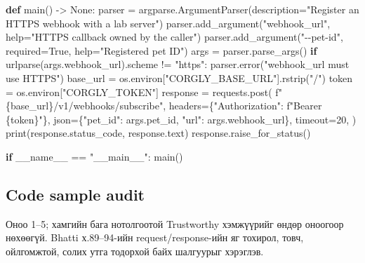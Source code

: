 \documentclass[
  mongolian,
]{article}
\newenvironment{Shaded}{}{}
\newcommand{\BuiltInTok}[1]{\textcolor[rgb]{0.00,0.50,0.00}{#1}}
\newcommand{\ControlFlowTok}[1]{\textcolor[rgb]{0.00,0.44,0.13}{\textbf{#1}}}
\newcommand{\DecValTok}[1]{\textcolor[rgb]{0.25,0.63,0.44}{#1}}
\newcommand{\KeywordTok}[1]{\textcolor[rgb]{0.00,0.44,0.13}{\textbf{#1}}}
\newcommand{\NormalTok}[1]{#1}
\newcommand{\OperatorTok}[1]{\textcolor[rgb]{0.40,0.40,0.40}{#1}}
\newcommand{\SpecialCharTok}[1]{\textcolor[rgb]{0.25,0.44,0.63}{#1}}
\newcommand{\SpecialStringTok}[1]{\textcolor[rgb]{0.73,0.40,0.53}{#1}}
\newcommand{\StringTok}[1]{\textcolor[rgb]{0.25,0.44,0.63}{#1}}
\newcommand{\VariableTok}[1]{\textcolor[rgb]{0.10,0.09,0.49}{#1}}
\begin{document}
\begin{Shaded}
\begin{Highlighting}[]
\KeywordTok{def}\NormalTok{ main() }\OperatorTok{{-}\textgreater{}} \VariableTok{None}\NormalTok{:}
\NormalTok{    parser }\OperatorTok{=}\NormalTok{ argparse.ArgumentParser(description}\OperatorTok{=}\StringTok{"Register an HTTPS webhook with a lab server"}\NormalTok{)}
\NormalTok{    parser.add\_argument(}\StringTok{"webhook\_url"}\NormalTok{, }\BuiltInTok{help}\OperatorTok{=}\StringTok{"HTTPS callback owned by the caller"}\NormalTok{)}
\NormalTok{    parser.add\_argument(}\StringTok{"{-}{-}pet{-}id"}\NormalTok{, required}\OperatorTok{=}\VariableTok{True}\NormalTok{, }\BuiltInTok{help}\OperatorTok{=}\StringTok{"Registered pet ID"}\NormalTok{)}
\NormalTok{    args }\OperatorTok{=}\NormalTok{ parser.parse\_args()}
    \ControlFlowTok{if}\NormalTok{ urlparse(args.webhook\_url).scheme }\OperatorTok{!=} \StringTok{"https"}\NormalTok{:}
\NormalTok{        parser.error(}\StringTok{"webhook\_url must use HTTPS"}\NormalTok{)}
\NormalTok{    base\_url }\OperatorTok{=}\NormalTok{ os.environ[}\StringTok{"CORGLY\_BASE\_URL"}\NormalTok{].rstrip(}\StringTok{"/"}\NormalTok{)}
\NormalTok{    token }\OperatorTok{=}\NormalTok{ os.environ[}\StringTok{"CORGLY\_TOKEN"}\NormalTok{]}
\NormalTok{    response }\OperatorTok{=}\NormalTok{ requests.post(}
        \SpecialStringTok{f"}\SpecialCharTok{\{}\NormalTok{base\_url}\SpecialCharTok{\}}\SpecialStringTok{/v1/webhooks/subscribe"}\NormalTok{,}
\NormalTok{        headers}\OperatorTok{=}\NormalTok{\{}\StringTok{"Authorization"}\NormalTok{: }\SpecialStringTok{f"Bearer }\SpecialCharTok{\{}\NormalTok{token}\SpecialCharTok{\}}\SpecialStringTok{"}\NormalTok{\},}
\NormalTok{        json}\OperatorTok{=}\NormalTok{\{}\StringTok{"pet\_id"}\NormalTok{: args.pet\_id, }\StringTok{"url"}\NormalTok{: args.webhook\_url\},}
\NormalTok{        timeout}\OperatorTok{=}\DecValTok{20}\NormalTok{,}
\NormalTok{    )}
    \BuiltInTok{print}\NormalTok{(response.status\_code, response.text)}
\NormalTok{    response.raise\_for\_status()}


\ControlFlowTok{if} \VariableTok{\_\_name\_\_} \OperatorTok{==} \StringTok{"\_\_main\_\_"}\NormalTok{:}
\NormalTok{    main()}
\end{Highlighting}
\end{Shaded}

\subsection{Code sample audit}\label{code-sample-audit}

Оноо 1--5; хамгийн бага нотолгоотой Trustworthy хэмжүүрийг өндөр
оноогоор нөхөөгүй. Bhatti х.89--94-ийн request/response-ийн яг тохирол,
товч, ойлгомжтой, солих утга тодорхой байх шалгуурыг хэрэглэв.
\end{document}
